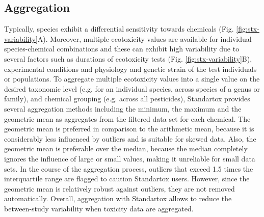 \subsection{Aggregation}
Typically, species exhibit a differential sensitivity towards chemicals (Fig. \ref{fig:stx-variability}A). Moreover, multiple ecotoxicity values are available for individual species-chemical combinations and these can exhibit high variability due to several factors such as durations of ecotoxicity tests (Fig. \ref{fig:stx-variability}B), experimental conditions and physiology and genetic strain of the test individuals or populations. To aggregate multiple ecotoxicity values into a single value on the desired taxonomic level (e.g. for an individual species, across species of a genus or family), and chemical grouping (e.g. across all pesticides), Standartox provides several aggregation methods including the minimum, the maximum and the geometric mean as aggregates from the filtered data set for each chemical. The geometric mean is preferred in comparison to the arithmetic mean, because it is considerably less influenced by outliers and is suitable for skewed data. Also, the geometric mean is preferable over the median, because the median completely ignores the influence of large or small values, making it unreliable for small data sets. In the course of the aggregation process, outliers that exceed 1.5 times the interquartile range are flagged to caution Standartox users. However, since the geometric mean is relatively robust against outliers, they are not removed automatically. Overall, aggregation with Standartox allows to reduce the between-study variability when toxicity data are aggregated.

